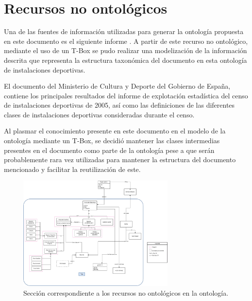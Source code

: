 \documentclass[a4paper,12pt]{article}
\begin{document}
	\section{Recursos no ontológicos}
	
	Una de las fuentes de información utilizadas para generar la ontología propuesta en este documento es el siguiente informe \cite{pdf-culturaydeporte}. A partir de este recurso no ontológico, mediante el uso de un T-Box se pudo realizar una modelización de la información descrita que representa la estructura taxonómica del documento en esta ontología de instalaciones deportivas. 
	
	El documento \cite{pdf-culturaydeporte} del Ministerio de Cultura y Deporte del Gobierno de España, contiene los  principales resultados del informe de explotación estadística del censo de instalaciones deportivas de 2005, así como las definiciones de las diferentes clases de instalaciones deportivas consideradas durante el censo.
	
	Al plasmar el conocimiento presente en este documento en el modelo de la ontología mediante un T-Box, se decidió mantener las clases intermedias presentes en el documento como parte de la ontología pese a que serán probablemente rara vez utilizadas para mantener la estructura del documento mencionado y facilitar la reutilización de este. 
	
	\begin{figure}[H]
		\centering
		\includegraphics[width=0.7\textwidth]{include/tbox.jpg}
		\caption{Sección correspondiente a los recursos no ontológicos en la ontología.}
	\end{figure}
	
\end{document}
